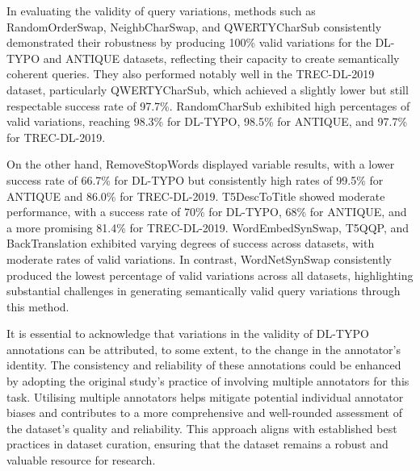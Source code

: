 In evaluating the validity of query variations, methods such as RandomOrderSwap, NeighbCharSwap, and QWERTYCharSub consistently demonstrated their robustness by producing 100\% valid variations for the DL-TYPO and ANTIQUE datasets, reflecting their capacity to create semantically coherent queries. They also performed notably well in the TREC-DL-2019 dataset, particularly QWERTYCharSub, which achieved a slightly lower but still respectable success rate of 97.7\%. RandomCharSub exhibited high percentages of valid variations, reaching 98.3\% for DL-TYPO, 98.5\% for ANTIQUE, and 97.7\% for TREC-DL-2019. 

On the other hand, RemoveStopWords displayed variable results, with a lower success rate of 66.7\% for DL-TYPO but consistently high rates of 99.5\% for ANTIQUE and 86.0\% for TREC-DL-2019. T5DescToTitle showed moderate performance, with a success rate of 70\% for DL-TYPO, 68\% for ANTIQUE, and a more promising 81.4\% for TREC-DL-2019. WordEmbedSynSwap, T5QQP, and BackTranslation exhibited varying degrees of success across datasets, with moderate rates of valid variations. In contrast, WordNetSynSwap consistently produced the lowest percentage of valid variations across all datasets, highlighting substantial challenges in generating semantically valid query variations through this method.

It is essential to acknowledge that variations in the validity of DL-TYPO annotations can be attributed, to some extent, to the change in the annotator's identity. The consistency and reliability of these annotations could be enhanced by adopting the original study's practice of involving multiple annotators for this task. Utilising multiple annotators helps mitigate potential individual annotator biases and contributes to a more comprehensive and well-rounded assessment of the dataset's quality and reliability. This approach aligns with established best practices in dataset curation, ensuring that the dataset remains a robust and valuable resource for research.